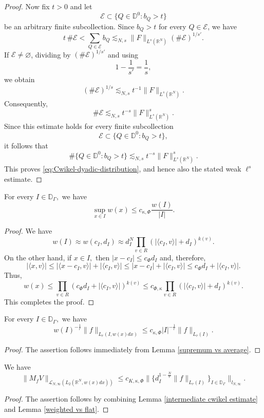 \documentclass[12pt]{amsart}
\begin{document}
\begin{proof}
Now fix $t>0$ and let
\[
\mathcal E
\subset
\{Q\in\mathbb D^0:b_Q>t\}
\]
be an arbitrary finite subcollection. Since $b_Q>t$ for every
$Q\in\mathcal E$, we have
\[
t\,\#\mathcal E
<
\sum_{Q\in\mathcal E}b_Q
\lesssim_{N,s}
\|F\|_{L^s(\mathbb R^N)}
(\#\mathcal E)^{1/s'}.
\]
If $\mathcal E\neq\varnothing$, dividing by
$(\#\mathcal E)^{1/s'}$ and using
\[
1-\frac1{s'}=\frac1s,
\]
we obtain
\[
(\#\mathcal E)^{1/s}
\lesssim_{N,s}
t^{-1}\|F\|_{L^s(\mathbb R^N)}.
\]
Consequently,
\[
\#\mathcal E
\lesssim_{N,s}
t^{-s}\|F\|_{L^s(\mathbb R^N)}^s.
\]
Since this estimate holds for every finite subcollection
\[
\mathcal E
\subset
\{Q\in\mathbb D^0:b_Q>t\},
\]
it follows that
\[
\#\bigl\{Q\in\mathbb D^0:b_Q>t\bigr\}
\lesssim_{N,s}
t^{-s}\|F\|_{L^s(\mathbb R^N)}^s.
\]
This proves \eqref{eq:Cwikel-dyadic-distribution}, and hence also the
stated weak $\ell^s$ estimate.
\end{proof}

\begin{lemma}\label{supremum vs average} For every $I\in\mathbb{D}_{\Gamma},$ we have
$$\sup_{x\in I}w(x)\leq c_{\kappa,\Phi}\frac{w(I)}{|I|}.$$
\end{lemma}
\begin{proof} We have
$$w(I)\approx w(c_I,d_I)\approx d_I^N\prod_{v\in R}(|\langle c_I,v\rangle|+d_I)^{k(v)}.$$
On the other hand, if $x\in I,$ then $|x-c_I|\leq c_{\Phi}d_I$ and, therefore,
$$|\langle x,v\rangle|\leq |\langle x-c_I,v\rangle|+|\langle c_I,v\rangle|\leq |x-c_I|+|\langle c_I,v\rangle|\leq c_{\Phi}d_I+|\langle c_I,v\rangle|.$$
Thus,
$$w(x)\leq \prod_{v\in R}(c_{\Phi}d_I+|\langle c_I,v\rangle|)^{k(v)}\leq c_{\Phi,\kappa}\prod_{v\in R}(|\langle c_I,v\rangle|+d_I)^{k(v)}.$$
This completes the proof.
\end{proof}

\begin{lemma}\label{weighted vs flat} For every $I\in\mathbb{D}_{\Gamma},$ we have
$$w(I)^{-\frac1r}\|f\|_{L_r(I,w(x)dx)}\leq c_{\kappa,\Phi}|I|^{-\frac1r}\|f\|_{L_r(I)}.$$
\end{lemma}
\begin{proof} The assertion follows immediately from Lemma \ref{supremum vs average}.
\end{proof}

\begin{lemma}\label{second intermediate cwikel estimate} We have
$$\|M_fV\|_{\mathcal{L}_{N,\infty}(L_2(\mathbb{R}^N,w(x)dx))}\leq c_{K,\kappa,\Phi}\Big\|\Big\{d_I^{1-\frac{N}{r}}\|f\|_{L_r(I)}\Big\}_{I\in\mathbb{D}_{\Gamma}}\Big\|_{l_{N,\infty}}.$$
\end{lemma}
\begin{proof} The assertion follows by combining Lemma \ref{intermediate cwikel estimate} and Lemma \ref{weighted vs flat}.
\end{proof}







\end{document}
